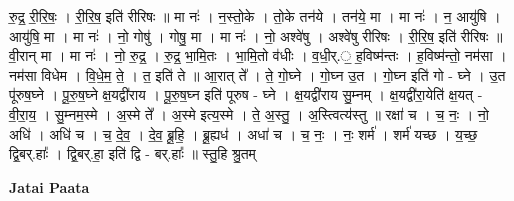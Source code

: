 \documentclass[17pt]{extarticle}
\begin{document}
रु॒द्र॒ री॒रि॒षः॒ । री॒रि॒ष॒ इति॑ रीरिषः ॥ मा नः॑ । न॒स्तो॒के । तो॒के तन॑ये । तन॑ये॒ मा । मा नः॑ । न॒ आयु॑षि । आयु॑षि॒ मा । मा नः॑ । नो॒ गोषु॑ । गोषु॒ मा । मा नः॑ । नो॒ अश्वे॑षु । अश्वे॑षु रीरिषः । री॒रि॒ष॒ इति॑ रीरिषः ॥ वी॒रान् मा । मा नः॑ । नो॒ रु॒द्र॒ । रु॒द्र॒ भा॒मि॒तः । भा॒मि॒तो व॑धीः । व॒धी॒र्.॒ ह॒विष्म॑न्तः । ह॒विष्म॑न्तो॒ नम॑सा । नम॑सा विधेम । वि॒धे॒म॒ ते॒ । त॒ इति॑ ते ॥ आ॒रात् ते᳚ । ते॒ गो॒घ्ने । गो॒घ्न उ॒त । गो॒घ्न इति॑ गो - घ्ने । उ॒त पू॑रुष॒घ्ने । पू॒रु॒ष॒घ्ने क्ष॒यद्वी॑राय । पू॒रु॒ष॒घ्न इति॑ पूरुष - घ्ने । क्ष॒यद्वी॑राय सु॒म्नम् । क्ष॒यद्वी॑रा॒येति॑ क्ष॒यत् - वी॒रा॒य॒ । सु॒म्नम॒स्मे । अ॒स्मे ते᳚ । अ॒स्मे इत्य॒स्मे । ते॒ अ॒स्तु॒ । अ॒स्त्वित्य॑स्तु ॥ रक्षा॑ च । च॒ नः॒ । नो॒ अधि॑ । अधि॑ च । च॒ दे॒व॒ । दे॒व॒ ब्रू॒हि॒ । ब्रू॒ह्यध॑ । अधा॑ च । च॒ नः॒ । नः॒ शर्म॑ । शर्म॑ यच्छ । य॒च्छ॒ द्वि॒बर्.हाः᳚ । द्वि॒बर्.हा॒ इति॑ द्वि - बर्.हाः᳚ ॥ स्तु॒हि श्रु॒तम् \newline

\textbf{Jatai Paata} \newline
\end{document}
